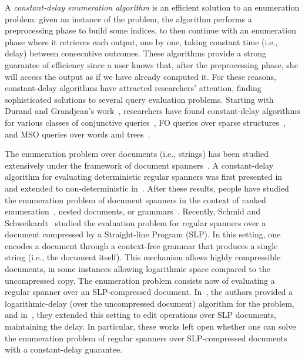
A \emph{constant-delay enumeration algorithm} is an efficient solution to an enumeration problem: given an instance of the problem, the algorithm performs a preprocessing phase to build some indices, to then continue with an enumeration phase where it retrieves each output, one by one, taking constant time (i.e., delay) between consecutive outcomes.
These algorithms provide a strong guarantee of efficiency since a user knows that, after the preprocessing phase, she will access the output as if we have already computed it. 
For these reasons, constant-delay algorithms have attracted researchers' attention, finding sophisticated solutions to several query evaluation problems. Starting with Durand and Grandjean's work~\cite{DurandG07}, researchers have found constant-delay algorithms for various classes of conjunctive queries~\cite{BaganDG07,CarmeliZBKS20}, FO queries over sparse structures~\cite{KazanaS11,SchweikardtSV18}, and MSO queries over words and trees~\cite{Bagan06,AmarilliBJM17}.

The enumeration problem over documents (i.e., strings) has been studied extensively under the framework of document spanners~\cite{FaginKRV15}. A constant-delay algorithm for evaluating deterministic regular spanners was first presented in~\cite{FlorenzanoRUVV20} and extended to non-deterministic in~\cite{AmarilliBMN21}. After these results, people have studied the enumeration problem of document spanners in the context of ranked enumeration~\cite{DoleschalKMP22,BourhisGJR21}, nested documents,
or  grammars~\cite{Peterfreund21
	}. 
Recently, Schmid and Schweikardt~\cite{SchmidS21,SchmidS22} studied the evaluation problem for regular spanners over a document compressed by a Straight-line Program (SLP). In this setting, one encodes a document through a context-free grammar that produces a single string (i.e., the document itself). This mechanism allows highly compressible documents, in some instances allowing logarithmic space compared to the uncompressed copy.
The enumeration problem consists now of evaluating a regular spanner over an SLP-compressed document. In~\cite{SchmidS21}, the authors provided a logarithmic-delay (over the uncompressed document) algorithm for the 
problem, and in~\cite{SchmidS22}, they extended this setting to edit operations over SLP documents, maintaining the delay. In particular, these works left open whether one can solve the enumeration problem of regular spanners over SLP-compressed documents with a constant-delay guarantee. 

